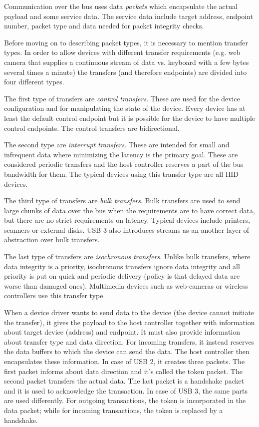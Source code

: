 Communication over the bus uses data \textit{packets} which encapsulate the
actual payload and some service data. The service data include target address,
endpoint number, packet type and data needed for packet integrity checks.

Before moving on to describing packet types, it is necessary to mention
transfer types. In order to allow devices with different transfer requirements
(e.g. web camera that supplies a continuous stream of data vs. keyboard with
a few bytes several times a minute) the transfers (and therefore endpoints) are
divided into four different types.

The first type of transfers are \textit{control transfers}. These are used for
the device configuration and for manipulating the state of the device. Every
device has at least the default control endpoint but it is possible for the
device to have multiple control endpoints. The control transfers are
bidirectional.

The second type are \textit{interrupt transfers}. These are intended for small
and infrequent data where minimizing the latency is the primary goal. These are
considered periodic transfers and the host controller reserves a part of the
bus bandwidth for them. The typical devices using this transfer type are all
HID devices.

The third type of transfers are \textit{bulk transfers}. Bulk transfers are
used to send large chunks of data over the bus when the requirements are to
have correct data, but there are no strict requirements on latency. Typical
devices include printers, scanners or external disks. USB 3 also introduces
streams as an another layer of abstraction over bulk transfers.

The last type of transfers are \textit{isochronous transfers}. Unlike bulk
transfers, where data integrity is a priority, isochronous transfers ignore
data integrity and all priority is put on quick and periodic delivery (policy
is that delayed data are worse than damaged ones). Multimedia devices such as
web-cameras or wireless controllers use this transfer type.

When a device driver wants to send data to the device (the device cannot
initiate the transfer), it gives the payload to the host controller together
with information about target device (address) and endpoint. It must also
provide information about transfer type and data direction. For incoming
transfers, it instead reserves the data buffers to which the device can send
the data. The host controller then encapsulates these information. In case of
USB 2, it creates three packets. The first packet informs about data direction
and it's called the token packet. The second packet transfers the actual data.
The last packet is a handshake packet and it is used to acknowledge the
transaction. In case of USB 3, the same parts are used differently. For
outgoing transactions, the token is incorporated in the data packet; while for
incoming transactions, the token is replaced by a handshake.

